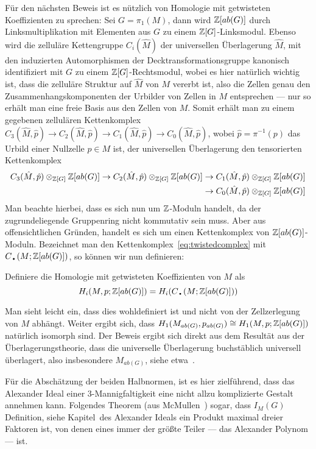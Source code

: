 	Für den nächsten Beweis ist es nützlich von Homologie mit getwisteten Koeffizienten zu sprechen: Sei $G=\pi_1(M)$, dann wird $\mathbb{Z}[ab(G)]$ durch Linksmultiplikation mit Elementen aus $G$ zu einem $\mathbb{Z}[G]$-Linksmodul. Ebenso wird die zelluläre Kettengruppe $C_i(\hat M)$ der universellen Überlagerung $\hat M$, mit den induzierten Automorphismen der Decktransformationsgruppe kanonisch identifiziert mit $G$ zu einem $\mathbb{Z}[G]$-Rechtsmodul, wobei es hier natürlich wichtig ist, dass die zelluläre Struktur auf $\hat M$ von $M$ vererbt ist, also die Zellen genau den Zusammenhangskomponenten der Urbilder von Zellen in $M$ entsprechen --- nur so erhält man eine freie Basis aus den Zellen von $M$. Somit erhält man zu einem gegebenen zellulären Kettenkomplex $C_3(\hat M,\hat p) \to C_2(\hat M,\hat p) \to C_1(\hat M,\hat p) \to C_0(\hat M,\hat p)$, wobei $\hat p = \pi^{-1}(p)$ das Urbild einer Nullzelle $p\in M$ ist, der universellen Überlagerung den tensorierten Kettenkomplex 
\begin{align}
			C_3(\hat M,\hat p)\otimes_{\mathbb{Z}[G]}\mathbb{Z}[ab(G)] \to C_2(\hat M,\hat p)\otimes_{\mathbb{Z}[G]}\mathbb{Z}[ab(G)]& \to C_1(\hat M,\hat p)\otimes_{\mathbb{Z}[G]}\mathbb{Z}[ab(G)] \label{eq:twistedcomplex}\\
			& \to C_0(\hat M,\hat p)\otimes_{\mathbb{Z}[G]}\mathbb{Z}[ab(G)]  \notag
	\end{align}	
	Man beachte hierbei, dass es sich nun um $\mathbb{Z}$-Moduln handelt, da der zugrundeliegende Gruppenring nicht kommutativ sein muss. Aber aus offensichtlichen Gründen, handelt es sich um einen Kettenkomplex von $\mathbb{Z}[ab(G)]$-Moduln. Bezeichnet man den Kettenkomplex~\eqref{eq:twistedcomplex} mit $C_\text{\textbullet}(M;\ZZ[ab(G)])$, so können wir nun definieren:

	\begin{defn}
		Definiere die Homologie mit getwisteten Koeffizienten von $M$ als
		\[
		 H_i(M,p;\ZZ[ab(G)])=H_i(C_\text{\textbullet}(M;\ZZ[ab(G)])) 	
		 \] 
	\end{defn}

	Man sieht leicht ein, dass dies wohldefiniert ist und nicht von der Zellzerlegung von $M$ abhängt. Weiter ergibt sich, dass $H_1( M_{ab(G)} ,  p_{ab(G)}) \cong H_1(M,p;\mathbb{Z}[ab(G)])$ natürlich isomorph sind. Der Beweis ergibt sich direkt aus dem Resultät aus der Überlagerungstheorie, dass die universelle Überlagerung buchstäblich universell überlagert, also insbesondere $M_{ab(G)}$, siehe etwa~\cite[Kapitel~1.3]{Hatcher.2002}.
    
    Für die Abschätzung der beiden Halbnormen, ist es hier zielführend, dass das Alexander Ideal einer 3-Mannigfaltigkeit eine nicht allzu komplizierte Gestalt annehmen kann. Folgendes Theorem (aus McMullen~\cite{MCMULLEN.2002}) sogar, dass $I_M(G)$ Definition, siehe Kapitel~des Alexander Ideals ein Produkt maximal dreier Faktoren ist, von denen eines immer der größte Teiler --- das Alexander Polynom --- ist. 

